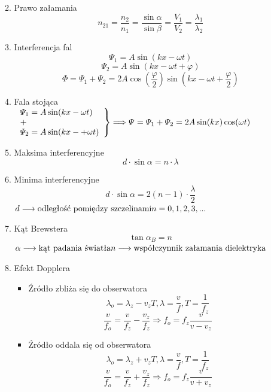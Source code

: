 \documentclass{article}
\begin{document}
\begin{enumerate}
\begin{enumerate}
\[			\]
			\item Prawo załamania
			\[
			n_{21} = \frac{n_2}{n_1} = \frac{\sin \alpha}{\sin \beta} = \frac{V_1}{V_2} = \frac{\lambda_1}{\lambda_2}
			\]
			\item Interferencja fal
			\[
			\varPsi_1 = A \sin (kx - \omega t)
			\]
			\[
			\varPsi_2 = A \sin (kx - \omega t + \varphi)
			\]
			\[
			\varPhi = \varPsi_1 + \varPsi_2 = 2A \cos \left( \frac{\varphi}{2} \right) \sin \left( kx - \omega t + \frac{\varphi}{2} \right)
			\]
			\item Fala stojąca \\
			$\left.
			\begin{array}{lll}
				\varPsi_1 = A \sin(kx - \omega t) \\
				+ \\
				\varPsi_2 = A \sin(kx -+\omega t)
			\end{array} 
			\right\} \Longrightarrow \varPsi = \varPsi_1 + \varPsi_2 = 2A \sin (kx) \cos (\omega t) \\ \\
			$
			\item Maksima interferencyjne
			\[
			d \cdot \sin \alpha = n \cdot \lambda
			\]
			\item Minima interferencyjne
			\[
			d \cdot \sin \alpha = 2(n - 1) \cdot \frac{\lambda}{2}
			\]
			$
			d \longrightarrow \text{odległość pomiędzy szczelinami} \\
			n = 0, 1, 2, 3, ... \\ \\
			$
			\item Kąt Brewstera
			\[
			\tan \alpha_B = n
			\]
			$
			\alpha \longrightarrow \text{kąt padania światła} \\
			n \longrightarrow \text{współczynnik załamania dielektryka} \\ \\
			$
			\item Efekt Dopplera
			\begin{itemize}
				\item Źródło zbliża się do obserwatora
				\[
				\lambda_o = \lambda_z - v_zT, \lambda = \frac{v}{f}, T = \frac{1}{f_z}
				\]
				\[
				\frac{v}{f_o} = \frac{v}{f_z} - \frac{v_z}{f_z} \Rightarrow f_o = f_z \frac{v}{v - v_z}
				\]
				\item Źródło oddala się od obserwatora
				\[
				\lambda_o = \lambda_z + v_zT, \lambda = \frac{v}{f}, T = \frac{1}{f_z}
				\]
				\[
				\frac{v}{f_o} = \frac{v}{f_z} + \frac{v_z}{f_z} \Rightarrow f_o = f_z \frac{v}{v + v_z}
\]
\end{itemize}
\end{enumerate}
\end{enumerate}
\end{document}
